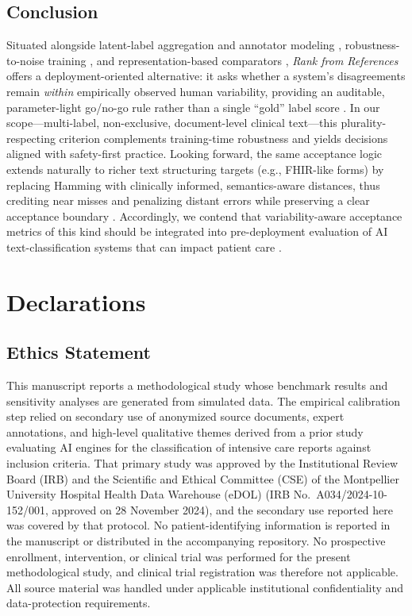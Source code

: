 \documentclass[12pt]{article}
\begin{document}
\subsection{Conclusion}

Situated alongside latent-label aggregation and annotator modeling \cite{dawid1979maximum,hui1980study,chou2019,fornaciari2021}, robustness-to-noise training \cite{garg2021,han2022,han2023,frenay2014,cannings2018}, and representation-based comparators \cite{disalvo2024}, \textit{Rank from References} offers a deployment-oriented alternative: it asks whether a system’s disagreements remain \emph{within} empirically observed human variability, providing an auditable, parameter-light go/no-go rule rather than a single “gold” label score \cite{basile2021,shojania2020,conover1972,SLCA}. In our scope---multi-label, non-exclusive, document-level clinical text---this plurality-respecting criterion complements training-time robustness and yields decisions aligned with safety-first practice. Looking forward, the same acceptance logic extends naturally to richer text structuring targets (e.g., FHIR-like forms) by replacing Hamming with clinically informed, semantics-aware distances, thus crediting near misses and penalizing distant errors while preserving a clear acceptance boundary \cite{basile2021,disalvo2024}. Accordingly, we contend that variability-aware acceptance metrics of this kind should be integrated into pre-deployment evaluation of AI text-classification systems that can impact patient care \cite{shojania2020,SLCA}.










\section{Declarations}

\subsection{Ethics Statement}
This manuscript reports a methodological study whose benchmark results and sensitivity analyses are generated from simulated data. The empirical calibration step relied on secondary use of anonymized source documents, expert annotations, and high-level qualitative themes derived from a prior study evaluating AI engines for the classification of intensive care reports against inclusion criteria. That primary study was approved by the Institutional Review Board (IRB) and the Scientific and Ethical Committee (CSE) of the Montpellier University Hospital Health Data Warehouse (eDOL) (IRB No.\ A034/2024-10-152/001, approved on 28 November 2024), and the secondary use reported here was covered by that protocol. No patient-identifying information is reported in the manuscript or distributed in the accompanying repository. No prospective enrollment, intervention, or clinical trial was performed for the present methodological study, and clinical trial registration was therefore not applicable. All source material was handled under applicable institutional confidentiality and data-protection requirements.
\end{document}
